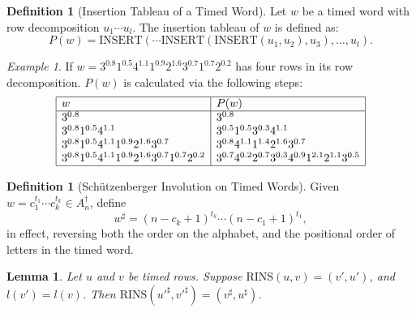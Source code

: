 \documentclass[10pt]{amsproc}
\newtheorem{lemma}[theorem]{Lemma}
\theoremstyle{definition}
\newtheorem{definition}[theorem]{Definition}
\theoremstyle{remark}
\newtheorem{example}[theorem]{Example}
\newcommand{\rowins}{\mathrm{RINS}}
\newcommand{\ins}{\mathrm{INSERT}}
\begin{document}
\begin{definition}
  [Insertion Tableau of a Timed Word]
  Let $w$ be a timed word with row decomposition $u_1\dotsb u_l$.
  The insertion tableau of $w$ is defined as:
  \begin{displaymath}
    P(w) = \ins(\dotsb\ins(\ins(u_1, u_2),u_3),\dotsc,u_l).
  \end{displaymath}
\end{definition}
\begin{example}
  If $w=3^{0.8}1^{0.5}4^{1.1}1^{0.9}2^{1.6}3^{0.7}1^{0.7}2^{0.2}$ has four rows in its row decomposition.
  $P(w)$ is calculated via the following steps:
  \begin{displaymath}
    \begin{array}{|l|l|}
      \hline
      w & P(w)\\
      \hline
      3^{0.8} & 3^{0.8}\\
      3^{0.8}1^{0.5}4^{1.1} & 3^{0.5}1^{0.5}3^{0.3}4^{1.1}\\
      3^{0.8}1^{0.5}4^{1.1}1^{0.9}2^{1.6}3^{0.7} & 3^{0.8}4^{1.1}1^{1.4}2^{1.6}3^{0.7}\\
      3^{0.8}1^{0.5}4^{1.1}1^{0.9}2^{1.6}3^{0.7}1^{0.7}2^{0.2} & 3^{0.7}4^{0.2}2^{0.7}3^{0.3}4^{0.9}1^{2.1}2^{1.1}3^{0.5}\\
      \hline
    \end{array}
  \end{displaymath}
\end{example}
\begin{definition}
  [Sch\"utzenberger Involution on Timed Words]
  \label{definition:schuetzenberger-involution}
  Given $w=c_1^{t_1}\dotsb c_k^{t_k}\in A_n^\dagger$, define
  \begin{equation}
    \label{eq:sharp}
    w^\sharp = (n-c_k+1)^{t_k} \dotsb (n-c_1+1)^{t_1},
  \end{equation}
  in effect, reversing both the order on the alphabet, and the positional order of letters in the timed word.
\end{definition}
\begin{lemma}
  \label{lemma:reverse-row-insertion}
  Let $u$ and $v$ be timed rows.
  Suppose $\rowins(u,v)=(v',u')$, and $l(v')=l(v)$.
  Then $\rowins({u'}^\sharp,{v'}^\sharp)=(v^\sharp,u^\sharp)$.
\end{lemma}
\end{document}

